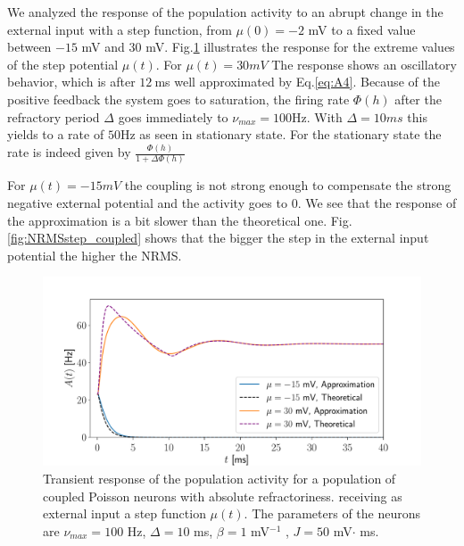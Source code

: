 \documentclass[12pt,twoside]{report}
\begin{document}
We analyzed the response of the population activity to an abrupt change in the external input with a step function, from $\mu(0)=-2$ mV to a fixed value between $-15$ mV and $30$ mV. Fig.\ref{fig:Astep_coupled}  illustrates the response for the extreme values of the step potential $\mu(t)$. For $\mu(t)=30mV$ The response shows an oscillatory behavior, which is after $12\:$ms well approximated by Eq.\eqref{eq:A4}.  Because of the positive feedback the system goes to saturation, the firing rate $\Phi(h)$ after the refractory period $\Delta$ goes immediately to $\nu_{max}=100$Hz. With $\Delta=10ms$ this yields to a rate of $50$Hz as seen in stationary state. For the stationary state the rate is indeed given by $\frac{\Phi(h)}{1+\Delta \Phi(h)}$

 For $\mu(t)=-15mV$ the coupling is not strong enough to compensate the strong negative external potential and the activity goes to $0$. We see that the response of the approximation is a bit slower than the theoretical one. Fig.\ref{fig:NRMSstep_coupled} shows that the bigger the step in the external input potential the higher the NRMS.


\begin{figure}[h!]
	\centering
	\includegraphics[width=0.8\linewidth]{Astep_coupled.pdf}
	\caption{Transient response of the population activity for a population of coupled Poisson neurons with absolute refractoriness. receiving as external input a step function $\mu(t)$. The parameters of the neurons are $\nu_{max}=100$ Hz, $\Delta=10$ ms, $\beta=1$ mV$^{-1}$ , $J=50$ mV$\cdot$ ms.
	}
	\label{fig:Astep_coupled}
\end{figure}
\end{document}
